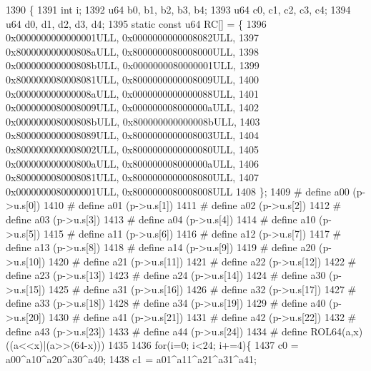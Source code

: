 \begin{DoxyCode}
1390                                            \{
1391   \textcolor{keywordtype}{int} i;
1392   u64 b0, b1, b2, b3, b4;
1393   u64 c0, c1, c2, c3, c4;
1394   u64 d0, d1, d2, d3, d4;
1395   \textcolor{keyword}{static} \textcolor{keyword}{const} u64 RC[] = \{
1396     0x0000000000000001ULL,  0x0000000000008082ULL,
1397     0x800000000000808aULL,  0x8000000080008000ULL,
1398     0x000000000000808bULL,  0x0000000080000001ULL,
1399     0x8000000080008081ULL,  0x8000000000008009ULL,
1400     0x000000000000008aULL,  0x0000000000000088ULL,
1401     0x0000000080008009ULL,  0x000000008000000aULL,
1402     0x000000008000808bULL,  0x800000000000008bULL,
1403     0x8000000000008089ULL,  0x8000000000008003ULL,
1404     0x8000000000008002ULL,  0x8000000000000080ULL,
1405     0x000000000000800aULL,  0x800000008000000aULL,
1406     0x8000000080008081ULL,  0x8000000000008080ULL,
1407     0x0000000080000001ULL,  0x8000000080008008ULL
1408   \};
1409 \textcolor{preprocessor}{# define a00 (p->u.s[0])}
1410 \textcolor{preprocessor}{# define a01 (p->u.s[1])}
1411 \textcolor{preprocessor}{# define a02 (p->u.s[2])}
1412 \textcolor{preprocessor}{# define a03 (p->u.s[3])}
1413 \textcolor{preprocessor}{# define a04 (p->u.s[4])}
1414 \textcolor{preprocessor}{# define a10 (p->u.s[5])}
1415 \textcolor{preprocessor}{# define a11 (p->u.s[6])}
1416 \textcolor{preprocessor}{# define a12 (p->u.s[7])}
1417 \textcolor{preprocessor}{# define a13 (p->u.s[8])}
1418 \textcolor{preprocessor}{# define a14 (p->u.s[9])}
1419 \textcolor{preprocessor}{# define a20 (p->u.s[10])}
1420 \textcolor{preprocessor}{# define a21 (p->u.s[11])}
1421 \textcolor{preprocessor}{# define a22 (p->u.s[12])}
1422 \textcolor{preprocessor}{# define a23 (p->u.s[13])}
1423 \textcolor{preprocessor}{# define a24 (p->u.s[14])}
1424 \textcolor{preprocessor}{# define a30 (p->u.s[15])}
1425 \textcolor{preprocessor}{# define a31 (p->u.s[16])}
1426 \textcolor{preprocessor}{# define a32 (p->u.s[17])}
1427 \textcolor{preprocessor}{# define a33 (p->u.s[18])}
1428 \textcolor{preprocessor}{# define a34 (p->u.s[19])}
1429 \textcolor{preprocessor}{# define a40 (p->u.s[20])}
1430 \textcolor{preprocessor}{# define a41 (p->u.s[21])}
1431 \textcolor{preprocessor}{# define a42 (p->u.s[22])}
1432 \textcolor{preprocessor}{# define a43 (p->u.s[23])}
1433 \textcolor{preprocessor}{# define a44 (p->u.s[24])}
1434 \textcolor{preprocessor}{# define ROL64(a,x) ((a<<x)|(a>>(64-x)))}
1435 
1436   \textcolor{keywordflow}{for}(i=0; i<24; i+=4)\{
1437     c0 = a00^a10^a20^a30^a40;
1438     c1 = a01^a11^a21^a31^a41;

\end{DoxyCode}
